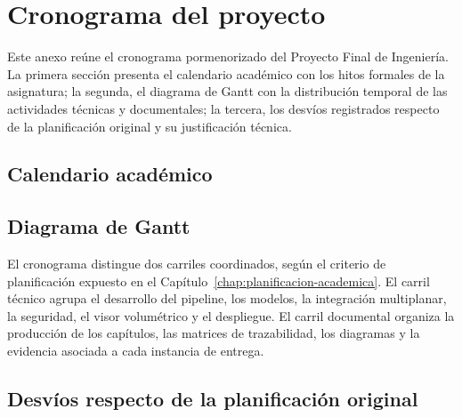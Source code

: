 \chapter{Cronograma del proyecto}
\label{anexo:cronograma-proyecto}

Este anexo reúne el cronograma pormenorizado del Proyecto Final de Ingeniería. La primera sección presenta el calendario académico con los hitos formales de la asignatura; la segunda, el diagrama de Gantt con la distribución temporal de las actividades técnicas y documentales; la tercera, los desvíos registrados respecto de la planificación original y su justificación técnica.

\section{Calendario académico}


\section{Diagrama de Gantt}



El cronograma distingue dos carriles coordinados, según el criterio de planificación expuesto en el Capítulo~\ref{chap:planificacion-academica}. El carril técnico agrupa el desarrollo del pipeline, los modelos, la integración multiplanar, la seguridad, el visor volumétrico y el despliegue. El carril documental organiza la producción de los capítulos, las matrices de trazabilidad, los diagramas y la evidencia asociada a cada instancia de entrega.


\section{Desvíos respecto de la planificación original}

